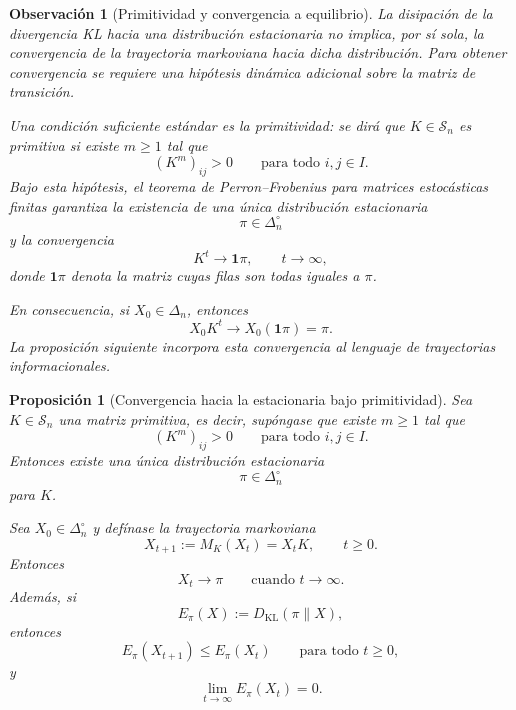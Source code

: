 \documentclass[12pt]{article}
\newtheorem{proposicion}{Proposición}[section]
\newtheorem{observacion}{Observación}[section]
\begin{document}
\begin{observacion}[Primitividad y convergencia a equilibrio]\label{obs:primitividad_convergencia_markov}
La disipación de la divergencia KL hacia una distribución estacionaria no implica, por sí sola, la convergencia de la trayectoria markoviana hacia dicha distribución. Para obtener convergencia se requiere una hipótesis dinámica adicional sobre la matriz de transición.

Una condición suficiente estándar es la primitividad: se dirá que \(K\in\mathcal S_n\) es primitiva si existe \(m\ge 1\) tal que
\[
(K^m)_{ij}>0
\qquad
\text{para todo }i,j\in I.
\]
Bajo esta hipótesis, el teorema de Perron--Frobenius para matrices estocásticas finitas garantiza la existencia de una única distribución estacionaria
\[
\pi\in\Delta_n^\circ
\]
y la convergencia
\[
K^t\longrightarrow \mathbf 1\pi,
\qquad t\to\infty,
\]
donde \(\mathbf 1\pi\) denota la matriz cuyas filas son todas iguales a \(\pi\).

En consecuencia, si \(X_0\in\Delta_n\), entonces
\[
X_0K^t\longrightarrow X_0(\mathbf 1\pi)=\pi.
\]
La proposición siguiente incorpora esta convergencia al lenguaje de trayectorias informacionales.
\end{observacion}


\begin{proposicion}[Convergencia hacia la estacionaria bajo primitividad]\label{prop:convergencia_primitiva_markov}
Sea \(K\in\mathcal S_n\) una matriz primitiva, es decir, supóngase que existe \(m\ge 1\) tal que
\[
(K^m)_{ij}>0
\qquad
\text{para todo }i,j\in I.
\]
Entonces existe una única distribución estacionaria
\[
\pi\in\Delta_n^\circ
\]
para \(K\).

Sea \(X_0\in\Delta_n^\circ\) y defínase la trayectoria markoviana
\[
X_{t+1}:=M_K(X_t)=X_tK,
\qquad t\ge 0.
\]
Entonces
\[
X_t\longrightarrow \pi
\qquad
\text{cuando }t\to\infty.
\]
Además, si
\[
E_\pi(X):=D_{\mathrm{KL}}(\pi\|X),
\]
entonces
\[
E_\pi(X_{t+1})\le E_\pi(X_t)
\qquad
\text{para todo }t\ge 0,
\]
y
\[
\lim_{t\to\infty}E_\pi(X_t)=0.
\]
\end{proposicion}
\end{document}
